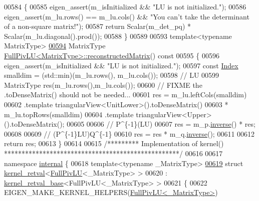 \begin{DoxyCode}
00584 \textcolor{keyword}{}\{
00585   eigen\_assert(m\_isInitialized && \textcolor{stringliteral}{"LU is not initialized."});
00586   eigen\_assert(m\_lu.rows() == m\_lu.cols() && \textcolor{stringliteral}{"You can't take the determinant of a non-square matrix!"});
00587   \textcolor{keywordflow}{return} Scalar(m\_det\_pq) * Scalar(m\_lu.diagonal().prod());
00588 \}
00589 
00593 \textcolor{keyword}{template}<\textcolor{keyword}{typename} MatrixType>
\hyperlink{group___l_u___module_a191a4f598b0c192a83ab48984e87ee51}{00594} MatrixType \hyperlink{group___l_u___module_a191a4f598b0c192a83ab48984e87ee51}{FullPivLU<MatrixType>::reconstructedMatrix}()\textcolor{keyword}{ const}
00595 \textcolor{keyword}{}\{
00596   eigen\_assert(m\_isInitialized && \textcolor{stringliteral}{"LU is not initialized."});
00597   \textcolor{keyword}{const} \hyperlink{group___core___module_a554f30542cc2316add4b1ea0a492ff02}{Index} smalldim = (std::min)(m\_lu.rows(), m\_lu.cols());
00598   \textcolor{comment}{// LU}
00599   MatrixType res(m\_lu.rows(),m\_lu.cols());
00600   \textcolor{comment}{// FIXME the .toDenseMatrix() should not be needed...}
00601   res = m\_lu.leftCols(smalldim)
00602             .template triangularView<UnitLower>().toDenseMatrix()
00603       * m\_lu.topRows(smalldim)
00604             .template triangularView<Upper>().toDenseMatrix();
00605 
00606   \textcolor{comment}{// P^\{-1\}(LU)}
00607   res = m\_p.\hyperlink{group___core___module_adb9af427f317202366c2832876064eb3}{inverse}() * res;
00608 
00609   \textcolor{comment}{// (P^\{-1\}LU)Q^\{-1\}}
00610   res = res * m\_q.\hyperlink{group___core___module_adb9af427f317202366c2832876064eb3}{inverse}();
00611 
00612   \textcolor{keywordflow}{return} res;
00613 \}
00614 
00615 \textcolor{comment}{/********* Implementation of kernel() **************************************************/}
00616 
00617 \textcolor{keyword}{namespace }\hyperlink{namespaceinternal}{internal} \{
00618 \textcolor{keyword}{template}<\textcolor{keyword}{typename} \_MatrixType>
\hyperlink{struct_eigen_1_1internal_1_1kernel__retval_3_01_full_piv_l_u_3_01___matrix_type_01_4_01_4}{00619} \textcolor{keyword}{struct }\hyperlink{struct_eigen_1_1internal_1_1kernel__retval}{kernel\_retval}<\hyperlink{group___l_u___module_class_eigen_1_1_full_piv_l_u}{FullPivLU}<\_MatrixType> >
00620   : \hyperlink{struct_eigen_1_1internal_1_1kernel__retval__base}{kernel\_retval\_base}<FullPivLU<\_MatrixType> >
00621 \{
00622   EIGEN\_MAKE\_KERNEL\_HELPERS(\hyperlink{group___l_u___module_class_eigen_1_1_full_piv_l_u}{FullPivLU<\_MatrixType>})

\end{DoxyCode}

